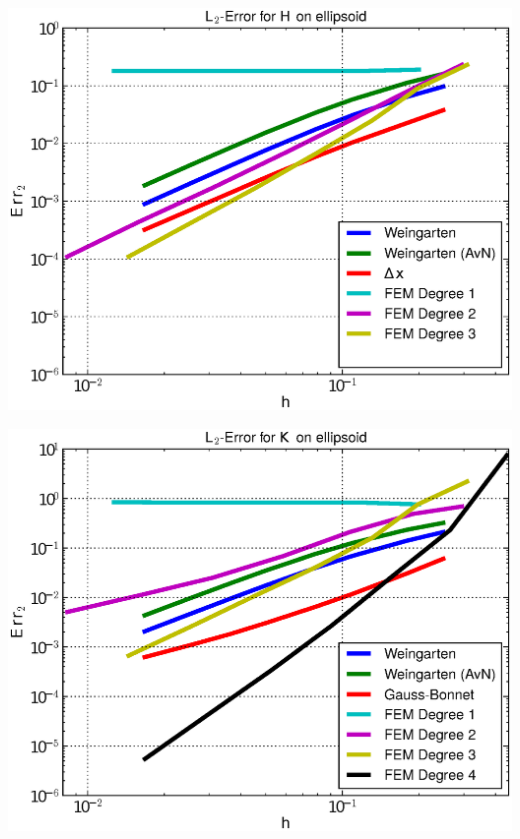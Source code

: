 \documentclass{beamer}
\begin{document}
\begin{frame}
\begin{overprint}
\begin{minipage}[t]{0.49\textwidth}
            \centering\includegraphics[width=\textwidth]{bilder/Curvature/heineC/ErrHL2_6.eps}
          \end{minipage}
          \begin{minipage}[t]{0.49\textwidth}
            \centering\includegraphics[width=\textwidth]{bilder/Curvature/heineC/ErrKL2_7.eps}
          \end{minipage}\hfill
          \begin{minipage}[t]{0.49\textwidth}

\end{minipage}
\end{overprint}
\end{frame}
\end{document}
